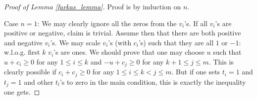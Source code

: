 \begin{proof}[Proof of Lemma \ref{farkas_lemma}]
	Proof is by induction on $n$.

	Case $n = 1$: We may clearly ignore all the zeros from the $v_{i}$'s. If all $v_{i}$'s are positive or negative, claim is trivial. Assume then that there are both positive and negative $v_{i}$'s. We may scale $v_{i}$'s (with $c_{i}$'s) such that they are all $1$ or $-1$: w.l.o.g. first $k$ $v_{i}$'s are ones. We should prove that one may choose $u$ such that $u + c_{i} \geq 0$ for any $1 \leq i \leq k$ and $-u + c_{j} \geq 0$ for any $k + 1 \leq j \leq m$. This is clearly possible if $c_{i} + c_{j} \geq 0$ for any $1 \leq i \leq k < j \leq m$. But if one sets $t_{i} = 1$ and $t_{j} = 1$ and other $t_{l}$'s to zero in the main condition, this is exactly the inequality one gets.


\end{proof}

